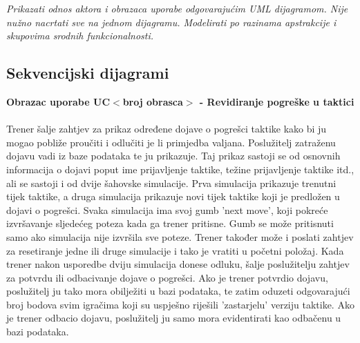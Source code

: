 					\textit{Prikazati odnos aktora i obrazaca uporabe odgovarajućim UML dijagramom. Nije nužno nacrtati sve na jednom dijagramu. Modelirati po razinama apstrakcije i skupovima srodnih funkcionalnosti.}
				\eject		
				
			\subsection{Sekvencijski dijagrami}
				
				\textbf{Obrazac uporabe UC$<$broj obrasca$>$ - Revidiranje pogreške u taktici}\\
				\\Trener šalje zahtjev za prikaz određene dojave o pogrešci taktike kako bi ju mogao pobliže proučiti i odlučiti je li primjedba valjana. Poslužitelj zatraženu dojavu vadi iz baze podataka te ju prikazuje. Taj prikaz sastoji se od osnovnih informacija o dojavi poput ime prijavljenje taktike, težine prijavljenje taktike itd., ali se sastoji i od dvije šahovske simulacije. Prva simulacija prikazuje trenutni tijek taktike, a druga simulacija prikazuje novi tijek taktike koji je predložen u dojavi o pogrešci. Svaka simulacija ima svoj gumb 'next move', koji pokreće izvršavanje sljedećeg poteza kada ga trener pritisne. Gumb se može pritisnuti samo ako simulacija nije izvršila sve poteze. Trener također može i poslati zahtjev za resetiranje jedne ili druge simulacije i tako je vratiti u početni položaj. Kada trener nakon usporedbe dviju simulacija donese odluku, šalje poslužitelju zahtjev za potvrdu ili odbacivanje dojave o pogrešci. Ako je trener potvrdio dojavu, poslužitelj ju tako mora obilježiti u bazi podataka, te zatim oduzeti odgovarajući broj bodova svim igračima koji su uspješno riješili 'zastarjelu' verziju taktike. Ako je trener odbacio dojavu, poslužitelj ju samo mora evidentirati kao odbačenu u bazi podataka.
				
